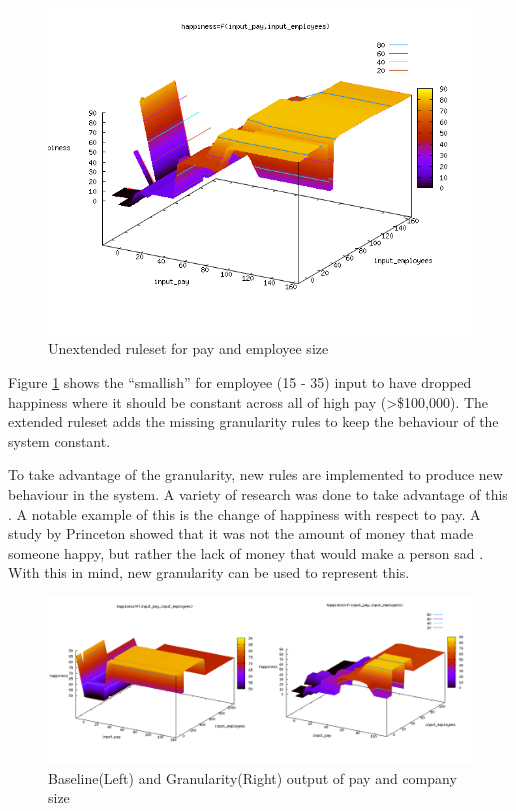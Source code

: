 \documentclass[12pt,fleqn,reqno,letterpaper]{article}
\begin{document}
\begin{figure}[H]
  \centering
  \includegraphics[scale=0.5,natwidth=650,natheight=501]{fig/extend_gran.png}
  \caption{Unextended ruleset for pay and employee size}
  \label{fig:EXTEND-GRAN}
\end{figure}
Figure \ref{fig:EXTEND-GRAN} shows the “smallish” for employee (15 - 35) input to have dropped happiness where it should be constant across all of high pay (>\$100,000).  The extended ruleset adds the missing granularity rules to keep the behaviour of the system constant.

To take advantage of the granularity, new rules are implemented to produce new behaviour in the system.  A variety of research was done to take advantage of this \cite{GRAN-2}.  A notable example of this is the change of happiness with respect to pay.  A study by Princeton showed that it was not the amount of money that made someone happy, but rather the lack of money that would make a person sad \cite{GRAN-1}.  With this in mind, new granularity can be used to represent this.

\begin{figure}[H]
  \centering
  \includegraphics[scale=0.5,natwidth=650,natheight=501]{fig/new_gran_rule.png}
  \caption{Baseline(Left) and Granularity(Right) output of pay and company size}
  \label{fig:NEW-GRAN-RULE}
\end{figure}
\end{document}
